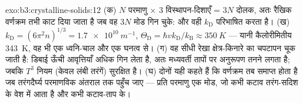 \begin{solution}{exo:b3:crystalline-solids:12}
(क) $N$ परमाणु $\times$ 3 विस्थापन-दिशाएँ = $3N$
दोलक, अतः रैखिक वर्णक्रम तभी काट दिया जाता है जब वह
$3N$ मोड गिन चुके: और वही $k_{\text{D}}$ परिभाषित करता है। (ख)
$k_{\text{D}} = (6\pi^2n)^{1/3} = \qty{1.7e10}{m^{-1}}$,
$\Theta_{\text{D}} = \hbar vk_{\text{D}}/k_{\text{B}} \approx
\qty{350}{K}$ --- यानी कैलोरीमितीय \qty{343}{K}, वह भी एक ध्वनि-चाल
और एक घनत्व से। (ग) वह सीधी रेखा क्षेत्र-किनारे का चपटापन चूक जाती
है: डिबाई ऊँची आवृत्तियाँ अधिक गिन लेता है, अतः मध्यवर्ती तापों पर
अनुरूपण तनने लगता है; जबकि $T^3$ नियम (केवल लंबी तरंगें) सुरक्षित है।
(घ) दोनों यही कहते हैं कि वर्णक्रम तब समाप्त होता है जब तरंगदैर्घ्य
परमाणविक अंतराल तक पहुँच जाए --- प्रति परमाणु एक मोड, जो कभी कटाव
तरंग-सदिश के वेश में आता है और कभी कटाव-ताप के।
\end{solution}

